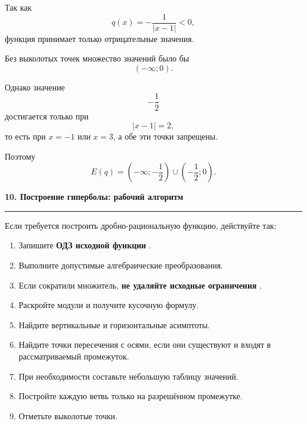 \documentclass[a4paper,12pt]{article}
\newcommand{\lessonsection}[1]{%
    \vspace{0.6em}
    {\Large\bfseries\color{darkaccent}#1}\par
    \vspace{0.15em}
    {\color{softgray}\rule{\linewidth}{0.8pt}}
    \vspace{0.3em}
}
\newcommand{\important}[1]{%
    {\color{darkaccent}\bfseries #1}%
}
\begin{document}
\begin{center}
\end{center}

Так как
\[
q(x)=-\frac1{|x-1|}<0,
\]
функция принимает только отрицательные значения.

Без выколотых точек множество значений было бы
\[
(-\infty;0).
\]

Однако значение
\[
-\frac12
\]
достигается только при
\[
|x-1|=2,
\]
то есть при \(x=-1\) или \(x=3\), а обе эти точки запрещены.

Поэтому
\[
\boxed{
E(q)=
\left(-\infty;-\frac12\right)
\cup
\left(-\frac12;0\right).}
\]


\lessonsection{10. Построение гиперболы: рабочий алгоритм}

Если требуется построить дробно-рациональную функцию, действуйте так:

\begin{enumerate}
    \item Запишите \important{ОДЗ исходной функции}.
    \item Выполните допустимые алгебраические преобразования.
    \item Если сократили множитель, \important{не удаляйте исходные ограничения}.
    \item Раскройте модули и получите кусочную формулу.
    \item Найдите вертикальные и горизонтальные асимптоты.
    \item Найдите точки пересечения с осями, если они существуют и входят
    в рассматриваемый промежуток.
    \item При необходимости составьте небольшую таблицу значений.
    \item Постройте каждую ветвь только на разрешённом промежутке.
    \item Отметьте выколотые точки.
\end{enumerate}
\end{document}
